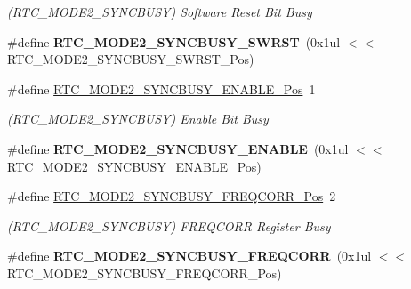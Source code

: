 \begin{DoxyCompactItemize}
\begin{DoxyCompactList}\small\item\em (R\+T\+C\+\_\+\+M\+O\+D\+E2\+\_\+\+S\+Y\+N\+C\+B\+U\+S\+Y) Software Reset Bit Busy \end{DoxyCompactList}\item 
\hypertarget{group___s_a_m_l21___r_t_c_gae987e9da37b9d895beea7afea18c5c1a}{}\#define {\bfseries R\+T\+C\+\_\+\+M\+O\+D\+E2\+\_\+\+S\+Y\+N\+C\+B\+U\+S\+Y\+\_\+\+S\+W\+R\+S\+T}~(0x1ul $<$$<$ R\+T\+C\+\_\+\+M\+O\+D\+E2\+\_\+\+S\+Y\+N\+C\+B\+U\+S\+Y\+\_\+\+S\+W\+R\+S\+T\+\_\+\+Pos)\label{group___s_a_m_l21___r_t_c_gae987e9da37b9d895beea7afea18c5c1a}

\item 
\hypertarget{group___s_a_m_l21___r_t_c_ga337bb0c2e0de20ba68024f62d9532774}{}\#define \hyperlink{group___s_a_m_l21___r_t_c_ga337bb0c2e0de20ba68024f62d9532774}{R\+T\+C\+\_\+\+M\+O\+D\+E2\+\_\+\+S\+Y\+N\+C\+B\+U\+S\+Y\+\_\+\+E\+N\+A\+B\+L\+E\+\_\+\+Pos}~1\label{group___s_a_m_l21___r_t_c_ga337bb0c2e0de20ba68024f62d9532774}

\begin{DoxyCompactList}\small\item\em (R\+T\+C\+\_\+\+M\+O\+D\+E2\+\_\+\+S\+Y\+N\+C\+B\+U\+S\+Y) Enable Bit Busy \end{DoxyCompactList}\item 
\hypertarget{group___s_a_m_l21___r_t_c_gac335d6eac4f3caceb8f6db1da8bf2fc1}{}\#define {\bfseries R\+T\+C\+\_\+\+M\+O\+D\+E2\+\_\+\+S\+Y\+N\+C\+B\+U\+S\+Y\+\_\+\+E\+N\+A\+B\+L\+E}~(0x1ul $<$$<$ R\+T\+C\+\_\+\+M\+O\+D\+E2\+\_\+\+S\+Y\+N\+C\+B\+U\+S\+Y\+\_\+\+E\+N\+A\+B\+L\+E\+\_\+\+Pos)\label{group___s_a_m_l21___r_t_c_gac335d6eac4f3caceb8f6db1da8bf2fc1}

\item 
\hypertarget{group___s_a_m_l21___r_t_c_ga2c5a8006faf803bca7f7c87b5630351f}{}\#define \hyperlink{group___s_a_m_l21___r_t_c_ga2c5a8006faf803bca7f7c87b5630351f}{R\+T\+C\+\_\+\+M\+O\+D\+E2\+\_\+\+S\+Y\+N\+C\+B\+U\+S\+Y\+\_\+\+F\+R\+E\+Q\+C\+O\+R\+R\+\_\+\+Pos}~2\label{group___s_a_m_l21___r_t_c_ga2c5a8006faf803bca7f7c87b5630351f}

\begin{DoxyCompactList}\small\item\em (R\+T\+C\+\_\+\+M\+O\+D\+E2\+\_\+\+S\+Y\+N\+C\+B\+U\+S\+Y) F\+R\+E\+Q\+C\+O\+R\+R Register Busy \end{DoxyCompactList}\item 
\hypertarget{group___s_a_m_l21___r_t_c_gae420ac7d526bc855884efa9e1a2645f5}{}\#define {\bfseries R\+T\+C\+\_\+\+M\+O\+D\+E2\+\_\+\+S\+Y\+N\+C\+B\+U\+S\+Y\+\_\+\+F\+R\+E\+Q\+C\+O\+R\+R}~(0x1ul $<$$<$ R\+T\+C\+\_\+\+M\+O\+D\+E2\+\_\+\+S\+Y\+N\+C\+B\+U\+S\+Y\+\_\+\+F\+R\+E\+Q\+C\+O\+R\+R\+\_\+\+Pos)\label{group___s_a_m_l21___r_t_c_gae420ac7d526bc855884efa9e1a2645f5}


\end{DoxyCompactItemize}
